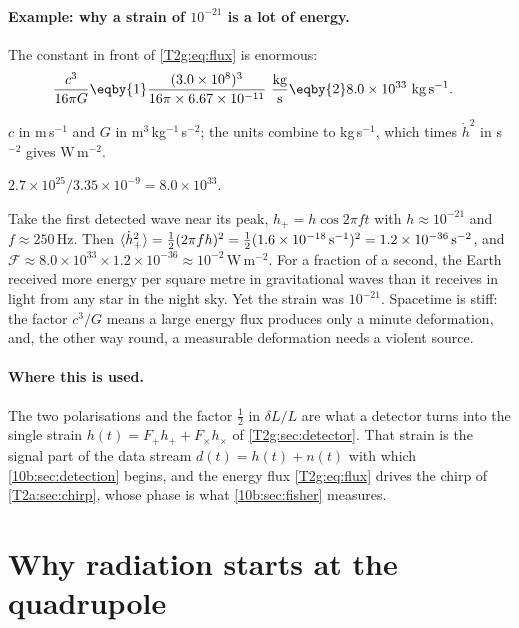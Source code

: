 \paragraph{Example: why a strain of $10^{-21}$ is a lot of energy.}
The constant in front of \eqref{T2g:eq:flux} is enormous:
\begin{align*}
  \frac{c^3}{16\pi G}
  &\eqby{1}\frac{(3.0\times10^8)^3}{16\pi\times6.67\times10^{-11}}\ \frac{\rm kg}{\rm s}
  \eqby{2}8.0\times10^{33}\ {\rm kg\,s^{-1}} .
\end{align*}
\begin{explain}
  \item $c$ in m\,s$^{-1}$ and $G$ in m$^3$\,kg$^{-1}$\,s$^{-2}$; the units combine to kg\,s$^{-1}$, which times $\dot h^2$ in s$^{-2}$ gives W\,m$^{-2}$.
  \item $2.7\times10^{25}/3.35\times10^{-9}=8.0\times10^{33}$.
\end{explain}
Take the first detected wave near its peak, $h_+=h\cos2\pi ft$ with $h\approx10^{-21}$ and $f\approx250$\,Hz. Then $\langle\dot h_+^2\rangle=\tfrac12(2\pi fh)^2=\tfrac12(1.6\times10^{-18}\,{\rm s^{-1}})^2=1.2\times10^{-36}\,{\rm s^{-2}}$, and $\mathcal F\approx8.0\times10^{33}\times1.2\times10^{-36}\approx10^{-2}$\,W\,m$^{-2}$. For a fraction of a second, the Earth received more energy per square metre in gravitational waves than it receives in light from any star in the night sky. Yet the strain was $10^{-21}$. Spacetime is stiff: the factor $c^3/G$ means a large energy flux produces only a minute deformation, and, the other way round, a measurable deformation needs a violent source.

\paragraph{Where this is used.}
The two polarisations and the factor $\tfrac12$ in $\delta L/L$ are what a detector turns into the single strain $h(t)=F_+h_++F_\times h_\times$ of \cref{T2g:sec:detector}. That strain is the signal part of the data stream $d(t)=h(t)+n(t)$ with which \cref{10b:sec:detection} begins, and the energy flux \eqref{T2g:eq:flux} drives the chirp of \cref{T2a:sec:chirp}, whose phase is what \cref{10b:sec:fisher} measures.
\section{Why radiation starts at the quadrupole}
\label{T2g:sec:quadrupole}

